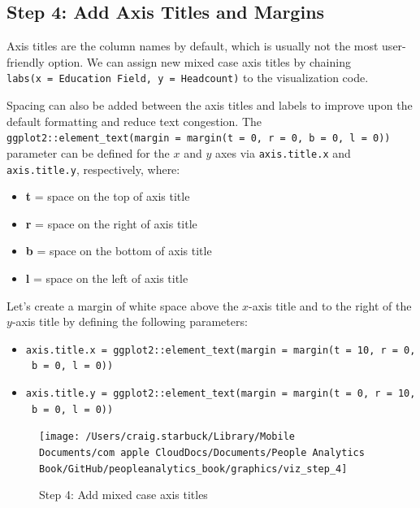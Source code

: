 \documentclass[
]{book}
\providecommand{\tightlist}{%
  \setlength{\itemsep}{0pt}\setlength{\parskip}{0pt}}
\begin{document}
\hypertarget{step-4-add-axis-titles-and-margins}{%
\subsection{Step 4: Add Axis Titles and Margins}\label{step-4-add-axis-titles-and-margins}}

Axis titles are the column names by default, which is usually not the most user-friendly option. We can assign new mixed case axis titles by chaining \texttt{labs(x\ =\ \textquotesingle{}Education\ Field\textquotesingle{},\ y\ =\ \textquotesingle{}Headcount\textquotesingle{})} to the visualization code.

Spacing can also be added between the axis titles and labels to improve upon the default formatting and reduce text congestion. The \texttt{ggplot2::element\_text(margin\ =\ margin(t\ =\ 0,\ r\ =\ 0,\ b\ =\ 0,\ l\ =\ 0))} parameter can be defined for the \(x\) and \(y\) axes via \texttt{axis.title.x} and \texttt{axis.title.y}, respectively, where:

\begin{itemize}
\tightlist
\item
  \textbf{t} = space on the top of axis title
\item
  \textbf{r} = space on the right of axis title
\item
  \textbf{b} = space on the bottom of axis title
\item
  \textbf{l} = space on the left of axis title
\end{itemize}

Let's create a margin of white space above the \(x\)-axis title and to the right of the \(y\)-axis title by defining the following parameters:

\begin{itemize}
\tightlist
\item
  \texttt{axis.title.x\ =\ ggplot2::element\_text(margin\ =\ margin(t\ =\ 10,\ r\ =\ 0,\ b\ =\ 0,\ l\ =\ 0))}
\item
  \texttt{axis.title.y\ =\ ggplot2::element\_text(margin\ =\ margin(t\ =\ 0,\ r\ =\ 10,\ b\ =\ 0,\ l\ =\ 0))}
\end{itemize}

\begin{figure}

{\centering \texttt{[image: /Users/craig.starbuck/Library/Mobile Documents/com~apple~CloudDocs/Documents/People Analytics Book/GitHub/peopleanalytics\_book/graphics/viz\_step\_4]} 

}

\caption{Step 4: Add mixed case axis titles}\label{fig:barchart-4}
\end{figure}
\end{document}
